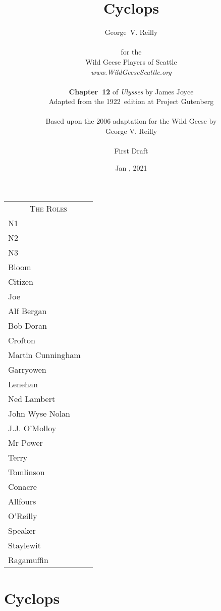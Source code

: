 


\title{\Huge Cyclops}
\author{George~V. Reilly\\
\\
{\small for the}\\
Wild Geese Players of Seattle\\
{\textit{www.WildGeeseSeattle.org}}\\
\\
{\small \textbf{Chapter~12} of \textit{Ulysses} by James Joyce}\\
{\small Adapted from the 1922~edition at Project Gutenberg}
\\
\\
{\small Based upon the 2006 adaptation for the Wild Geese by}\\
{\small George V. Reilly}\\
\\
{\small First Draft}}
\date{Jan , 2021}
\raggedbottom



\maketitle
\thispagestyle{empty}
\pagebreak

\begin{tabular}{lp{10cm}}
    \multicolumn{2}{c}{\Large \textsc{The Roles}} \\
N1 \\
N2 \\
N3 \\
Bloom \\
Citizen \\
Joe \\
Alf Bergan \\
Bob Doran \\
Crofton \\
Martin Cunningham \\
Garryowen \\
Lenehan \\
Ned Lambert \\
John Wyse Nolan \\
J.J. O'Molloy \\
Mr Power \\
Terry \\
Tomlinson \\
Conacre \\
Allfours \\
O'Reilly \\
Speaker \\
Staylewit \\
Ragamuffin \\


\end{tabular}

\thispagestyle{empty}
\newpage


\setcounter{page}{1}

\section*{Cyclops}




